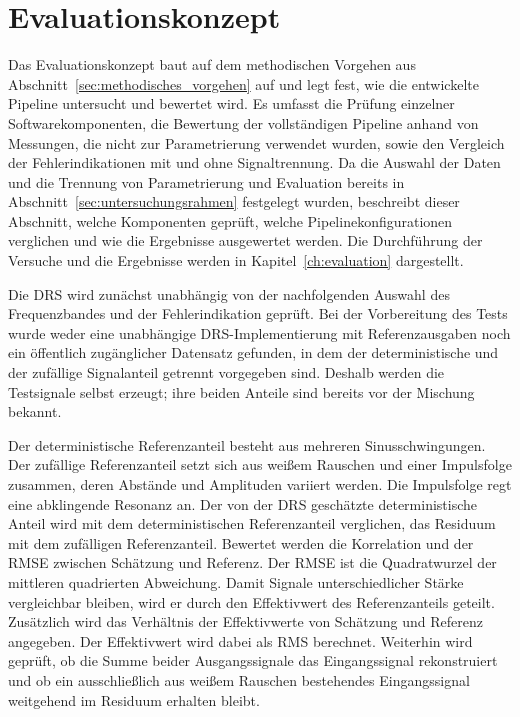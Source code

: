 \section{Evaluationskonzept}
\label{sec:evaluationskonzept}

Das Evaluationskonzept baut auf dem methodischen Vorgehen aus
Abschnitt~\ref{sec:methodisches_vorgehen} auf und legt fest, wie die entwickelte
Pipeline untersucht und bewertet wird. Es umfasst die Prüfung einzelner
Softwarekomponenten, die Bewertung der vollständigen Pipeline anhand von
Messungen, die nicht zur Parametrierung verwendet wurden, sowie den Vergleich
der Fehlerindikationen mit und ohne Signaltrennung. Da die Auswahl der Daten
und die Trennung von Parametrierung und Evaluation bereits in
Abschnitt~\ref{sec:untersuchungsrahmen} festgelegt wurden, beschreibt dieser
Abschnitt, welche Komponenten geprüft, welche Pipelinekonfigurationen verglichen
und wie die Ergebnisse ausgewertet werden. Die Durchführung der Versuche und
die Ergebnisse werden in
Kapitel~\ref{ch:evaluation} dargestellt.


Die \gls{DRS} wird zunächst unabhängig von der nachfolgenden Auswahl des
Frequenzbandes und der Fehlerindikation geprüft. Bei der Vorbereitung des Tests
wurde weder eine unabhängige DRS-Implementierung mit Referenzausgaben noch ein
öffentlich zugänglicher Datensatz gefunden, in dem der deterministische und
der zufällige Signalanteil getrennt vorgegeben sind. Deshalb werden die
Testsignale selbst erzeugt; ihre beiden Anteile sind bereits vor der Mischung
bekannt.

Der deterministische Referenzanteil besteht aus mehreren Sinusschwingungen.
Der zufällige Referenzanteil setzt sich aus weißem Rauschen und einer
Impulsfolge zusammen, deren Abstände und Amplituden variiert werden. Die
Impulsfolge regt eine abklingende Resonanz an. Der von der \gls{DRS} geschätzte
deterministische Anteil wird mit dem deterministischen Referenzanteil
verglichen, das Residuum mit dem zufälligen Referenzanteil. Bewertet werden die
Korrelation und der \gls{RMSE} zwischen Schätzung und Referenz. Der
\gls{RMSE} ist die Quadratwurzel der mittleren quadrierten Abweichung. Damit Signale
unterschiedlicher Stärke vergleichbar bleiben, wird er durch den Effektivwert
des Referenzanteils geteilt. Zusätzlich wird das Verhältnis der Effektivwerte
von Schätzung und Referenz angegeben. Der Effektivwert wird dabei als
\gls{RMS} berechnet. Weiterhin wird geprüft, ob die Summe
beider Ausgangssignale das Eingangssignal rekonstruiert und ob ein
ausschließlich aus weißem Rauschen bestehendes Eingangssignal weitgehend im
Residuum erhalten bleibt.

